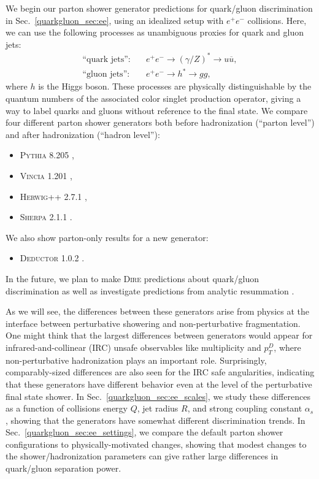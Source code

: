\documentclass[11pt]{cernrep}
\begin{document}
We begin our parton shower generator predictions for quark/gluon discrimination in Sec.~\ref{quarkgluon_sec:ee}, using an idealized setup with $e^+e^-$ collisions.  Here, we can use the following processes as unambiguous proxies for quark and gluon jets:
\begin{align}
\text{``quark jets''}: \quad & e^+e^- \to (\gamma/Z)^* \to u \overline{u}, \\
\text{``gluon jets''}: \quad & e^+e^- \to h^* \to g g,
\end{align}
where $h$ is the Higgs boson.  These processes are physically distinguishable by the quantum numbers of the associated color singlet production operator, giving a way to label quarks and gluons without reference to the final state.  We compare four different parton shower generators both before hadronization (``parton level'') and after hadronization (``hadron level''):
\begin{itemize}
\item \textsc{Pythia 8.205} \cite{Sjostrand:2014zea},
\item \textsc{Vincia 1.201} \cite{Giele:2013ema},
\item \textsc{Herwig++ 2.7.1} \cite{Bellm:2013hwb},
\item \textsc{Sherpa 2.1.1} \cite{Gleisberg:2008ta}.
\end{itemize}
We also show parton-only results for a new generator:
\begin{itemize}
\item \textsc{Deductor 1.0.2} \cite{Nagy:2014mqa}.
\end{itemize}
In the future, we plan to make \textsc{Dire} \cite{Hoche:2015sya} predictions about quark/gluon discrimination as well as investigate predictions from analytic resummation \cite{Larkoski:2013eya,Larkoski:2014pca}.

As we will see, the differences between these generators arise from physics at the interface between perturbative showering and non-perturbative fragmentation.  One might think that the largest differences between generators would appear for infrared-and-collinear (IRC) unsafe observables like multiplicity and $p_T^D$, where non-perturbative hadronization plays an important role.  Surprisingly, comparably-sized differences are also seen for the IRC safe angularities, indicating that these generators have different behavior even at the level of the perturbative final state shower.  In Sec.~\ref{quarkgluon_sec:ee_scales}, we study these differences as a function of collisions energy $Q$, jet radius $R$, and strong coupling constant $\alpha_s$, showing that the generators have somewhat different discrimination trends.  In Sec.~\ref{quarkgluon_sec:ee_settings}, we compare the default parton shower configurations to physically-motivated changes, showing that modest changes to the shower/hadronization parameters can give rather large differences in quark/gluon separation power.
\end{document}
